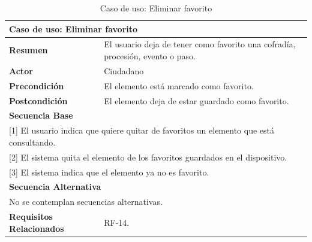 \begin{table}[h!]
    \centering
    \renewcommand{\arraystretch}{1.5}

    \begin{tabular}{|p{4cm}|p{11cm}|}
        \hline
        \multicolumn{2}{|l|}{\textbf{Caso de uso: Eliminar favorito}} \\
        \hline
        \textbf{Resumen} & El usuario deja de tener como favorito una cofradía, procesión, evento o paso. \\
        \hline
        \textbf{Actor} & Ciudadano \\
        \hline
        \textbf{Precondición} & El elemento está marcado como favorito. \\
        \hline
        \textbf{Postcondición} & El elemento deja de estar guardado como favorito. \\
        \hline
        \multicolumn{2}{|l|}{\textbf{Secuencia Base}} \\
        \hline
        \multicolumn{2}{|p{15cm}|}{ [1] El usuario indica que quiere quitar de favoritos un elemento que está consultando. } \\
        \hline
        \multicolumn{2}{|p{15cm}|}{ [2] El sistema quita el elemento de los favoritos guardados en el dispositivo. } \\
        \hline
        \multicolumn{2}{|p{15cm}|}{ [3] El sistema indica que el elemento ya no es favorito. } \\
        \hline
        \multicolumn{2}{|l|}{\textbf{Secuencia Alternativa}} \\
        \hline
        \multicolumn{2}{|p{15cm}|}{ No se contemplan secuencias alternativas. } \\
        \hline
        \textbf{Requisitos Relacionados} & RF-14. \\
        \hline
    \end{tabular}
    \caption{Caso de uso: Eliminar favorito}
\end{table}

